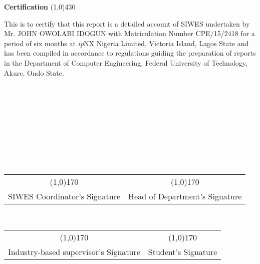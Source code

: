\begin{center}
{\huge \bf Certification}
\line(1,0){430}
\end{center}



This is to certify that this report is a detailed account of \ac{SIWES} undertaken by Mr. JOHN OWOLABI IDOGUN with Matriculation Number CPE/15/2418 for a period of six months at \textit{ip}NX Nigeria Limited, Victoria Island, Lagos State and has been compiled in accordance to regulations guiding the preparation of reports in the Department of Computer Engineering, Federal University of Technology, Akure, Ondo State.\\\\\\\\\\\\\\\\\\\

\begin{center}
	\begin{tabular}{c c}
	 \line(1,0){170} & \hspace{2.5cm} \line(1,0){170}\\
	 SIWES Coordinator's Signature  & \hspace{2.5cm} Head of Department's Signature\\
	\end{tabular}\\
	\vspace{1.0in}
	\begin{tabular}{c c}
		\line(1,0){170} & \hspace{2.5cm} \line(1,0){170}\\
		Industry-based supervisor's Signature  & \hspace{2.5cm} Student's Signature
	\end{tabular}
\end{center}